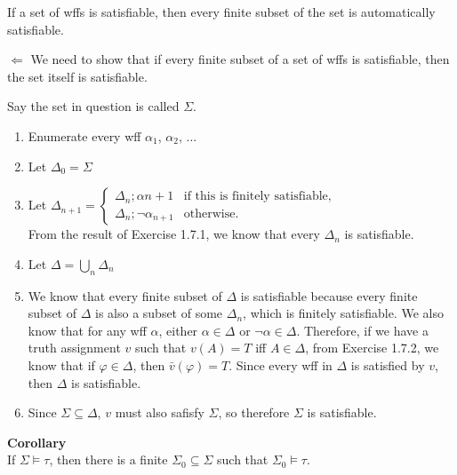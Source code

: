 \documentclass[12pt]{article}	%
\begin{document}
\begin{flushleft}
If a set of wffs is satisfiable, then every finite subset of the set is automatically satisfiable. \\

\vspace{5mm}

$\Leftarrow$ We need to show that if every finite subset of a set of wffs is satisfiable, then the set itself is satisfiable. \\

\vspace{2mm}

Say the set in question is called $\Sigma$.

\begin{enumerate}
	\item Enumerate every wff $\alpha_1$, $\alpha_2$, $\ldots$
	\item Let $\Delta_0 = \Sigma$
	\item Let 
	$
	\Delta_{n+1} = 
	\begin{cases}
	\Delta_n;\alpha{n+1}      & \text{if this is finitely satisfiable,}\\
	\Delta_n;\neg\alpha_{n+1} & \text{otherwise.}
	\end{cases}
	$ \\
	From the result of Exercise 1.7.1, we know that every $\Delta_n$ is satisfiable.
	\item Let $\Delta = \bigcup_n\Delta_n$
	\item We know that every finite subset of $\Delta$ is satisfiable because every finite subset of $\Delta$ is also a subset of some $\Delta_n$, which is finitely satisfiable. We also know that for any wff $\alpha$, either $\alpha \in \Delta$ or $\neg\alpha \in \Delta$. Therefore, if we have a truth assignment $v$ such that $v(A) = T$ iff $A \in \Delta$, from Exercise 1.7.2, we know that if $\varphi \in \Delta$, then $\bar{v}(\varphi) = T$. Since every wff in $\Delta$ is satisfied by $v$, then $\Delta$ is satisfiable.
	\item Since $\Sigma \subseteq \Delta$, $v$ must also safisfy $\Sigma$, so therefore $\Sigma$ is satisfiable.
\end{enumerate}

\vspace{10mm}

\textbf{Corollary} \\
If $\Sigma \models \tau$, then there is a finite $\Sigma_0 \subseteq \Sigma$ such that $\Sigma_0 \models \tau$.


\end{flushleft}
\end{document}
